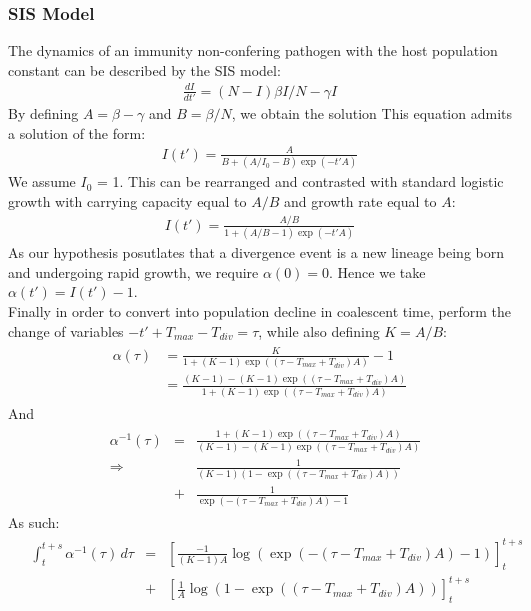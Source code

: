 \documentclass{report}
\theoremstyle{definition}
\begin{document}
\subsubsection{SIS Model}
The dynamics of an immunity non-confering pathogen with the host population constant can be described by the SIS model\cite{keeling_introduction_2008}:
\begin{gather}
\frac{dI}{dt'} = (N-I)\beta I/N -\gamma I
\end{gather}
By defining $A=\beta-\gamma$ and $B=\beta/N$, we obtain the solution 
This equation admits a solution of the form:
\begin{gather}
I(t') = \frac{A}{B+(A/I_0-B)\exp(-t'A)}
\end{gather}
We assume $I_0$ = 1.
This can be rearranged and contrasted with standard logistic growth with carrying capacity equal to $A/B$ and growth rate equal to $A$: 
\begin{gather}
I(t') = \frac{A/B}{1+(A/B - 1)\exp(-t'A)}
\end{gather}
As our hypothesis posutlates that a divergence event is a new lineage being born and undergoing rapid growth, we require $\alpha(0) = 0$. Hence we take $\alpha(t') = I(t')-1$.\\
Finally in order to convert into population decline in coalescent time, perform the change of variables $-t'+T_{max} - T_{div} = \tau$, while also defining $K=A/B$:
\begin{gather}
\begin{aligned}
  \alpha(\tau) &= \frac{K}{1+(K - 1)\exp((\tau-T_{max}+T_{div})A)}-1\\
               &= \frac{(K-1)- (K - 1)\exp((\tau-T_{max}+T_{div})A)}{1+(K - 1)\exp((\tau-T_{max}+T_{div})A)}
\end{aligned}
\end{gather}
And
\begin{gather}
\begin{aligned}
&\alpha^{-1}(\tau) &=&  \frac{1+(K - 1)\exp((\tau-T_{max}+T_{div})A)}{(K-1)- (K - 1)\exp((\tau-T_{max}+T_{div})A)}\\
&\Rightarrow&& \frac{1}{(K-1)(1-\exp((\tau-T_{max}+T_{div})A))}\\
&&+& \frac{1}{\exp(-(\tau-T_{max}+T_{div})A)-1}
\end{aligned}
\end{gather}
As such:
\begin{gather}
\begin{aligned}\label{eq:sis_int}
&\int_t^{t+s}{\alpha^{-1}(\tau)\,d\tau}&=& \left[\frac{-1}{(K-1)A}\log(\exp(-(\tau-T_{max}+T_{div})A)-1)\right]_t^{t+s}\\
&&+&\left[\frac{1}{A}\log(1-\exp((\tau-T_{max}+T_{div})A))\right]_t^{t+s}
\end{aligned}
\end{gather}
\end{document}
